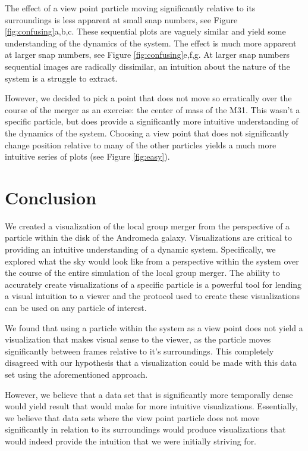 \documentclass[twocolumn]{aastex63}
\begin{document}
The effect of a view point particle moving significantly relative to its surroundings is less apparent at small snap numbers, see Figure \ref{fig:confusing}a,b,c. These sequential plots are vaguely similar and yield some understanding of the dynamics of the system. The effect is much more apparent at larger snap numbers, see Figure \ref{fig:confusing}e,f,g. At larger snap numbers sequential images are radically dissimilar, an intuition about the nature of the system is a struggle to extract. 

However, we decided to pick a point that does not move so erratically over the course of the merger as an exercise: the center of mass of the M31. This wasn't a specific particle, but does provide a significantly more intuitive understanding of the dynamics of the system. Choosing a view point that does not significantly change position relative to many of the other particles yields a much more intuitive series of plots (see Figure \ref{fig:easy}).

\section{Conclusion} \label{sec:style}

We created a visualization of the local group merger from the perspective of a particle within the disk of the Andromeda galaxy. Visualizations are critical to providing an intuitive understanding of a dynamic system. Specifically, we explored what the sky would look like from a perspective within the system over the course of the entire simulation of the local group merger. The ability to accurately create visualizations of a specific particle is a powerful tool for lending a visual intuition to a viewer and the protocol used to create these visualizations can be used on any particle of interest.

We found that using a particle within the system as a view point does not yield a visualization that makes visual sense to the viewer, as the particle moves significantly between frames relative to it's surroundings. This completely disagreed with our hypothesis that a visualization could be made with this data set using the aforementioned approach. 

However, we believe that a data set that is significantly more temporally dense would yield result that would make for more intuitive visualizations. Essentially, we believe that data sets where the view point particle does not move significantly in relation to its surroundings would produce visualizations that would indeed provide the intuition that we were initially striving for. 
\end{document}
